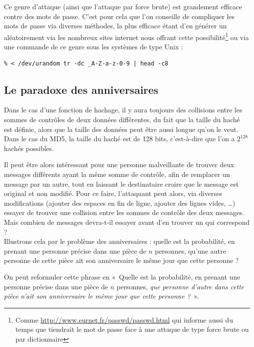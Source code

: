 Ce genre d'attaque (ainsi que l'attaque par force brute)
est grandement efficace contre des mots de passe. C'est
pour cela que l'on conseille de compliquer les mots de passe via
diverses méthodes, la plus efficace étant d'en générer un
aléatoirement via les nombreux sites internet nous offrant cette
possibilité\footnote{Comme
\url{http://www.eurnet.fr/passwd/passwd.html} qui informe aussi
du temps que tiendrait le mot de passe face à une attaque de type
force brute ou par dictionnaire} ou via une commande de ce genre sous les systèmes
de type Unix :
\lstset{language=bash}
\begin{lstlisting}
% < /dev/urandom tr -dc _A-Z-a-z-0-9 | head -c8 
\end{lstlisting}

\subsection{Le paradoxe des anniversaires}
Dans le cas d'une fonction de hachage, il y aura toujours des
collisions entre les sommes de contrôles de deux données
différentes, du fait que la taille du haché est définie, alors que
la taille des données peut être aussi longue qu'on le veut.
Dans le cas du MD5, la taille du haché est de 128 bits,
c'est-à-dire que l'on a $2^{128}$ hachés possibles.

Il peut être alors intéressant pour une personne malveillante de
trouver deux messages différents ayant la même somme de contrôle,
afin de remplacer un message par un autre, tout en laissant le
destinataire croire que le message est original et non modifié. Pour ce
faire, l'attaquant peut alors, via diverses modifications (ajouter
des espaces en fin de ligne, ajouter des lignes vides, …) essayer
de trouver une collision entre les sommes de contrôle des deux
messages. Mais combien de messages devra-t-il essayer avant d'en
trouver un qui correspond ?
\\

Illustrons cela par le problème des anniversaires : quelle est la
probabilité, en prenant une personne précise dans une pièce de $n$
personnes, qu'une autre personne de cette pièce ait son
anniversaire le même jour que cette personne ?

On peut reformuler cette phrase en «~Quelle est la probabilité, en
prenant une personne précise dans une pièce de $n$ personnes,
\emph{que personne d'autre dans cette pièce n'ait son anniversaire
le même jour que cette personne ?}~».

